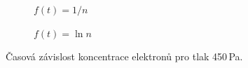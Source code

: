 \documentclass[a4paper,12pt]{article}
\begin{document}
\begin{figure}[h]
	\centering
	\begin{subfigure}[b]{.49\linewidth}
		\centering
		\caption{$f(t) = 1/n$}
	\end{subfigure}
	\begin{subfigure}[b]{.49\linewidth}
		\centering
		\caption{$f(t) = \ln n$}
	\end{subfigure}
	\caption{Časová závislost koncentrace elektronů pro tlak 450\,Pa.}
	\label{g:450Pa}
\end{figure}
\end{document}
